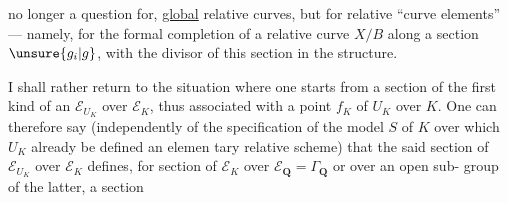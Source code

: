 no longer a question for,
\uline{global} relative curves, but for relative ``curve
elements'' --- namely, for the
formal completion of a relative curve
$X/B$ along a section $\unsure{g_i|g}$,
with the divisor of this section  %
in the structure.

I shall rather return to the situation
where one starts from a section of the first
kind of an $\mathcal E_{U_K}$ over $\mathcal E_K$, thus associated
with a  point $f_K$ of $U_K$ over $K$.
One can therefore say (independently of
the specification of the model $S$ of $K$ over
which $U_K$  already be defined
 an elemen%
tary relative scheme) that the said section of
$\mathcal E_{U_K}$ over $\mathcal E_K$  defines, for  section
of $\mathcal E_K$ over $\mathcal E_{\mathbf Q}=\Gamma_{\mathbf Q}$ or over an open sub-%
group  of the latter, a section
